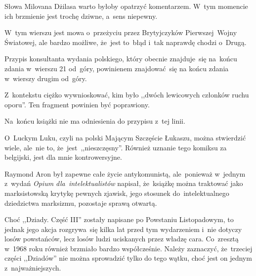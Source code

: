\documentclass[a4paper,11pt]{article}
\begin{document}
\vspace{\spaceFour}


\start {} Słowa Milovana Dżilasa warto byłoby opatrzyć
komentarzem. W~tym momencie ich brzmienie jest trochę dziwne, a~sens
niepewny.

\vspace{\spaceFour}


\start {} W~tym wierszu jest mowa o~przeżyciu przez
Brytyjczyków Pierwszej~Wojny Światowej, ale bardzo możliwe, że~jest
to~błąd i~tak naprawdę chodzi o~Drugą.

\vspace{\spaceFour}


\start {} Przypis konsultanta wydania polskiego, który obecnie
znajduje~się na~końcu zdania w~wierszu 21 od~góry, powinienem
znajdować~się na końcu zdania w~wierszy drugim od~góry.

\vspace{\spaceFour}


\start {} Z~kontekstu ciężko wywnioskować, kim było
,,dwóch lewicowych członków ruchu oporu''. Ten fragment powinien być
poprawiony.

\vspace{\spaceFour}


\start {} Na~końcu książki nie ma odniesienia do przypisu
z~tej linii.

\vspace{\spaceFour}


\start {} O~Luckym Luku, czyli na polski Mającym
Szczęście Łukaszu, można stwierdzić wiele, ale~nie to,
że~jest~,,nieszczęsny''. Również uznanie tego komiksu za belgijski,
jest dla mnie kontrowersyjne.

\vspace{\spaceFour}


\start {} Raymond Aron był zapewne całe życie antykomunistą,
ale~ponieważ w~jednym z~wydań \emph{Opium dla~intelektualistów}
napisał, że~książkę można traktować jako marksistowską krytykę pewnych
zjawisk, jego stosunek do~intelektualnego dziedzictwa marksizmu,
pozostaje sprawą otwartą.

\vspace{\spaceFour}


\start {} Choć ,,Dziady. Część III'' zostały napisane po
Powstaniu Listopadowym, to jednak jego akcja rozgrywa~się kilka lat
przed tym wydarzeniem i~nie dotyczy losów powstańców, lecz losów ludzi
uciskanych przez władzę cara. Co~zresztą w~1968 roku również brzmiało
bardzo współcześnie. Należy zaznaczyć, że~trzeciej części ,,Dziadów''
nie można sprowadzić tylko do tego wątku, choć jest on jednym
z~najważniejszych.
\end{document}

